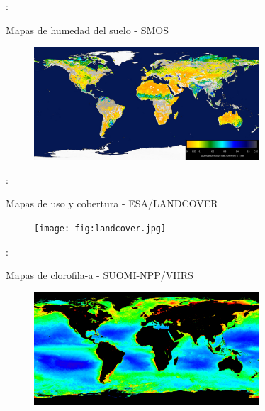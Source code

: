 \documentclass[handout,aspectratio=169]{beamer}
\begin{document}
\begin{frame}{\secname : \subsecname}
    \begin{exampleblock}{Mapas de humedad del suelo - SMOS}
        \begin{figure}[h!]
            \centering
            \includegraphics[width=0.75\textwidth]{fig:smos.jpg}
            \label{fig:smos}
        \end{figure}
    \end{exampleblock}
\end{frame}

\begin{frame}{\secname : \subsecname}
    \begin{exampleblock}{Mapas de uso y cobertura - ESA/LANDCOVER}
        \begin{figure}[h!]
            \centering
            \texttt{[image: fig:landcover.jpg]}
            \label{fig:landcover}
        \end{figure}
    \end{exampleblock}
\end{frame}

\begin{frame}{\secname : \subsecname}
    \begin{exampleblock}{Mapas de clorofila-a - SUOMI-NPP/VIIRS}
        \begin{figure}[h!]
            \centering
            \includegraphics[width=0.75\textwidth]{fig:chl.png}
            \label{fig:chl}
        \end{figure}
    \end{exampleblock}
\end{frame}
\end{document}
